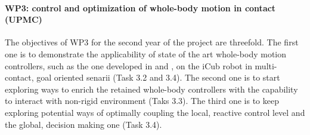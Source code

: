 \paragraph{WP3: control and optimization of whole-body motion in contact (UPMC)}

The objectives of WP3 for the second year of the project are threefold. The first one is to demonstrate the applicability of state of the art whole-body motion controllers, such as the one developed in \cite{salini2012} and \cite{delprete2013}, on the iCub robot in multi-contact, goal oriented senarii (Task  3.2 and 3.4). The second one is to start exploring ways to enrich the retained whole-body controllers with the capability to interact with non-rigid environment (Taks 3.3). The third one is to keep exploring potential ways of optimally coupling the local, reactive control level and the global, decision making one (Task 3.4).
